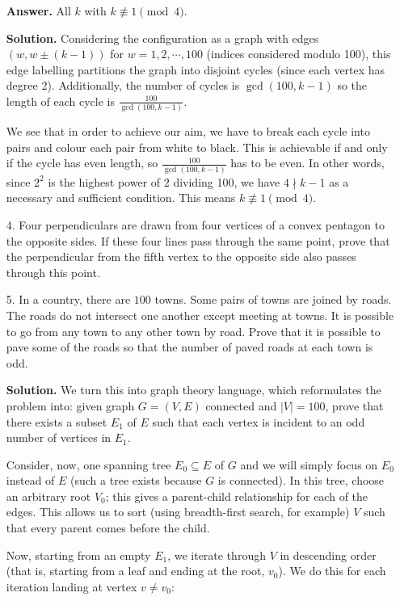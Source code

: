\documentclass[11pt,a4paper]{article}
\begin{document}
\begin{enumerate}
	\textbf{Answer.} All $k$ with $k\not\equiv 1\pmod{4}$. 
	
	\textbf{Solution.} Considering the configuration as a graph with edges $(w, w\pm (k-1))$ for $w=1, 2, \cdots, 100$ (indices considered modulo 100), this edge labelling partitions the graph into disjoint cycles (since each vertex has degree 2). Additionally, the number of cycles is $\gcd(100, k-1)$ so the length of each cycle is $\frac{100}{\gcd(100, k-1)}$. 
	
	We see that in order to achieve our aim, we have to break each cycle into pairs and colour each pair from white to black. This is achievable if and only if the cycle has even length, so $\frac{100}{\gcd(100, k-1)}$ has to be even. In other words, since $2^2$ is the highest power of $2$ dividing 100, we have $4\nmid k-1$ as a necessary and sufficient condition. This means $k\not\equiv 1\pmod{4}$. 
	
	\item[4.] Four perpendiculars are drawn from four vertices of a convex pentagon to the opposite sides. If these four lines pass through the same point, prove that the perpendicular from the fifth vertex to the opposite side also passes through this point.
	
	\item[5.] In a country, there are $100$ towns. Some pairs of towns are joined by roads. The roads do not intersect one another except meeting at towns. It is possible to go from any town to any other town by road. Prove that it is possible to pave some of the roads so that the number of paved roads at each town is odd.
	
	\textbf{Solution.} We turn this into graph theory language, which reformulates the problem into: given graph $G=(V, E)$ connected and $|V|=100$, prove that there exists a subset $E_1$ of $E$ such that each vertex is incident to an odd number of vertices in $E_1$. 
	
	Consider, now, one spanning tree $E_0\subseteq E$ of $G$ and we will simply focus on $E_0$ instead of $E$ (such a tree exists because $G$ is connected). In this tree, choose an arbitrary root $V_0$; this gives a parent-child relationship for each of the edges. This allows us to sort (using breadth-first search, for example) $V$ such that every parent comes before the child. 
	
	Now, starting from an empty $E_1$, we iterate through $V$ in descending order (that is, starting from a leaf and ending at the root, $v_0$). We do this for each iteration landing at vertex $v\neq v_0$: 
	

\end{enumerate}
\end{document}
